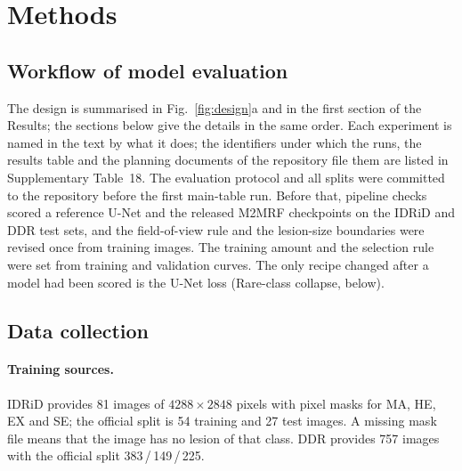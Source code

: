 \section{Methods}

\subsection{Workflow of model evaluation}
The design is summarised in Fig.~\ref{fig:design}a and in the first section of the Results; the sections below give the details in the same order. Each experiment is named in the text by what it does; the identifiers under which the runs, the results table and the planning documents of the repository file them are listed in Supplementary Table~18. The evaluation protocol and all splits were committed to the repository before the first main-table run. Before that, pipeline checks scored a reference U-Net and the released M2MRF checkpoints on the IDRiD and DDR test sets, and the field-of-view rule and the lesion-size boundaries were revised once from training images. The training amount and the selection rule were set from training and validation curves. The only recipe changed after a model had been scored is the U-Net loss (Rare-class collapse, below).

\subsection{Data collection}
\paragraph{Training sources.} IDRiD\cite{porwal2018idrid} provides 81 images of $4288\times2848$ pixels with pixel masks for MA, HE, EX and SE; the official split is 54 training and 27 test images. A missing mask file means that the image has no lesion of that class. DDR\cite{li2019ddr} provides 757 images with the official split 383\,/\,149\,/\,225.

